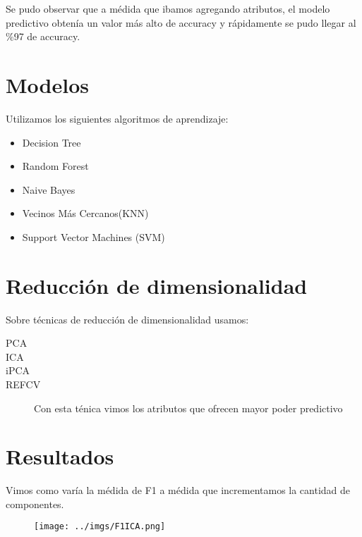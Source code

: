 \documentclass[10pt, a4paper]{article}
\begin{document}
Se pudo observar que a médida que ibamos agregando atributos, el modelo predictivo obtenía un valor más alto de accuracy y rápidamente se pudo llegar al \%97 de accuracy.

\section{Modelos}
Utilizamos los siguientes algoritmos de aprendizaje:

\begin{itemize}
\item Decision Tree
\item Random Forest
\item Naive Bayes
\item Vecinos Más Cercanos(KNN)
\item Support Vector Machines (SVM)
\end{itemize}


\section{Reducción de dimensionalidad}
Sobre técnicas de reducción de dimensionalidad usamos:

\begin{description}
\item [PCA]
\item [ICA]
\item [iPCA]
\item [REFCV] Con esta ténica vimos los atributos que ofrecen mayor poder predictivo
\end{description}

\section{Resultados}

Vimos como varía la médida de F1 a médida que incrementamos la cantidad de componentes.
\begin{figure}[H]
\centering
\texttt{[image: ../imgs/F1ICA.png]}
\end{figure}
\end{document}
